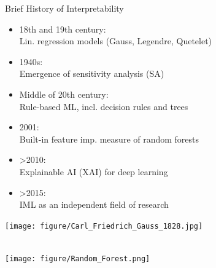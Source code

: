 \documentclass[10pt,compress,t,notes=noshow, xcolor=table]{beamer}
\begin{document}
\begin{frame}{Brief History of Interpretability}

\begin{splitVCC}[0.75]
{
\begin{itemize}
        \item 18th and 19th century: \\Lin. regression models (Gauss, Legendre, Quetelet)
        \item 1940s:\\ Emergence of sensitivity analysis (SA)
        \medskip
        \item Middle of 20th century:\\ Rule-based ML, incl. decision rules and  trees
        \medskip
        \item 2001:\\ Built-in feature imp. measure of random forests
        \medskip
        \item >2010: \\Explainable AI (XAI) for deep learning
        \medskip
        \item >2015: \\IML as an independent field of research
    \end{itemize}
}
{
    \texttt{[image: figure/Carl\_Friedrich\_Gauss\_1828.jpg]}
    
    \centering {}
    \centering {}
    \bigskip\\
    \texttt{[image: figure/Random\_Forest.png]}

}
\end{splitVCC}
\end{frame}

\endlecture
\end{document}
